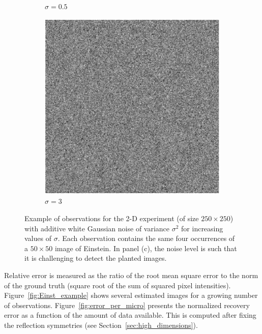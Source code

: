 \documentclass[12pt]{article}
\newcommand{\1}{\mathbf{1}}
\theoremstyle{plain}
\theoremstyle{definition}
\theoremstyle{remark}
\theoremstyle{plain}
\theoremstyle{remark}
\theoremstyle{plain}
\theoremstyle{plain}
\theoremstyle{plain}
\numberwithin{equation}{section}
\begin{document}
\begin{figure}[t]
\begin{subfigure}[h]{0.33\linewidth}
		\caption{$\sigma = 0.5$}
	\end{subfigure}
	\begin{subfigure}[h]{0.33\linewidth}
		\centering
		\includegraphics[width=.8\linewidth]{micrograph_Einstein_example_s3}
		\caption{$\sigma = 3$}
	\end{subfigure}
	\caption{\label{fig:micro_example} Example of observations for the 2-D experiment (of size $250\times 250$) with additive white Gaussian noise of variance $\sigma^2$ for increasing values of $\sigma$. Each observation contains the same four occurrences of a $50 \times 50$ image of Einstein. In panel (c), the noise level is such that it is challenging to detect  the planted images.} %
\end{figure}

Relative error is measured as the ratio of the root mean square error to the norm of the ground truth (square root of the sum of squared pixel intensities). Figure~\ref{fig:Einst_example} shows several estimated images for a growing number of observations. Figure~\ref{fig:error_per_micro} presents the normalized recovery error as a function of the amount of data available.  This is computed after fixing the reflection symmetries (see Section~\ref{sec:high_dimensions}).
\end{document}
